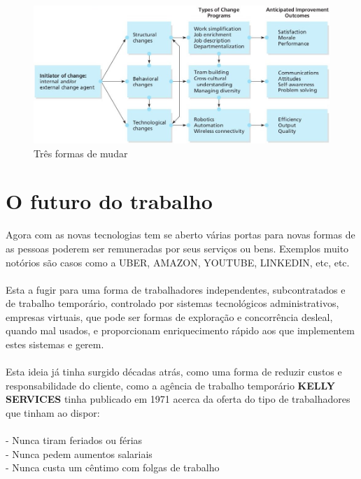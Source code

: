 \begin{figure}[H]
	\centering
	\includegraphics[scale=0.52]{./image/Change/Three Change Approaches.jpg}
	\caption{Três formas de mudar \cite{book_6}}
\end{figure}
\newpage
\section{O futuro do trabalho}
\qquad Agora com as novas tecnologias tem se aberto várias portas para novas formas de as pessoas poderem ser remuneradas por seus serviços ou bens. Exemplos muito notórios são casos como a UBER, AMAZON, YOUTUBE, LINKEDIN, etc, etc.\\
\\
Esta a fugir para uma forma de trabalhadores independentes, subcontratados e de trabalho temporário, controlado por sistemas tecnológicos administrativos, empresas virtuais, que pode ser formas de exploração e concorrência desleal, quando mal usados, e proporcionam enriquecimento rápido aos que implementem estes sistemas e gerem. \\
\\
Esta ideia já tinha surgido décadas atrás, como uma forma de reduzir custos e responsabilidade do cliente, como a agência de trabalho temporário \textbf{KELLY SERVICES} tinha publicado em 1971 acerca da oferta do tipo de trabalhadores que tinham ao dispor: \cite{book_11} \\
\\
\hspace*{.5cm} - Nunca tiram feriados ou férias\\
\hspace*{.5cm} - Nunca pedem aumentos salariais\\
\hspace*{.5cm} - Nunca custa um cêntimo com folgas de trabalho\\
